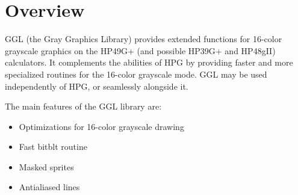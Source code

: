 \section{Overview}\label{main_overview}
GGL (the Gray Graphics Library) provides extended functions for 16-color grayscale graphics on the HP49G+ (and possible HP39G+ and HP48g\-II) calculators. It complements the abilities of HPG by providing faster and more specialized routines for the 16-color grayscale mode. GGL may be used independently of HPG, or seamlessly alongside it.

The main features of the GGL library are:

\begin{itemize}
\item Optimizations for 16-color grayscale drawing\item Fast bitblt routine\item Masked sprites\item Antialiased lines \end{itemize}
